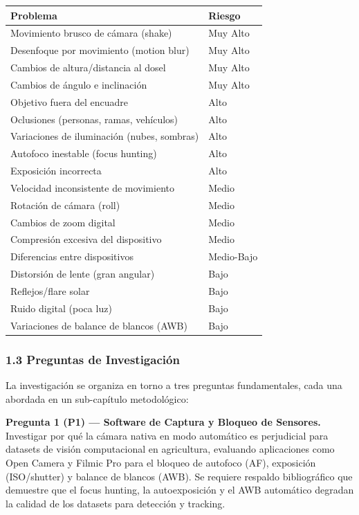 \begin{tabular}{ll}
\hline
Problema & Riesgo \\
\hline
Movimiento brusco de cámara (shake) & Muy Alto \\
Desenfoque por movimiento (motion blur) & Muy Alto \\
Cambios de altura/distancia al dosel & Muy Alto \\
Cambios de ángulo e inclinación & Muy Alto \\
Objetivo fuera del encuadre & Alto \\
Oclusiones (personas, ramas, vehículos) & Alto \\
Variaciones de iluminación (nubes, sombras) & Alto \\
Autofoco inestable (focus hunting) & Alto \\
Exposición incorrecta & Alto \\
Velocidad inconsistente de movimiento & Medio \\
Rotación de cámara (roll) & Medio \\
Cambios de zoom digital & Medio \\
Compresión excesiva del dispositivo & Medio \\
Diferencias entre dispositivos & Medio-Bajo \\
Distorsión de lente (gran angular) & Bajo \\
Reflejos/flare solar & Bajo \\
Ruido digital (poca luz) & Bajo \\
Variaciones de balance de blancos (AWB) & Bajo \\
\hline
\end{tabular}


\subsubsection{1.3 Preguntas de Investigación}


La investigación se organiza en torno a tres preguntas fundamentales, cada una abordada en un sub-capítulo metodológico:


\textbf{Pregunta 1 (P1) — Software de Captura y Bloqueo de Sensores.} Investigar por qué la cámara nativa en modo automático es perjudicial para datasets de visión computacional en agricultura, evaluando aplicaciones como Open Camera y Filmic Pro para el bloqueo de autofoco (AF), exposición (ISO/shutter) y balance de blancos (AWB). Se requiere respaldo bibliográfico que demuestre que el focus hunting, la autoexposición y el AWB automático degradan la calidad de los datasets para detección y tracking.


